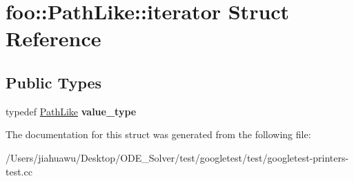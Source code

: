 \hypertarget{structfoo_1_1_path_like_1_1iterator}{}\section{foo\+:\+:Path\+Like\+:\+:iterator Struct Reference}
\label{structfoo_1_1_path_like_1_1iterator}
\subsection*{Public Types}
\begin{DoxyCompactItemize}
\item 
\mbox{\label{structfoo_1_1_path_like_1_1iterator_a797c204878a09e04b23cfe6b48ac7016}} 
typedef \mbox{\hyperlink{classfoo_1_1_path_like}{Path\+Like}} {\bfseries value\+\_\+type}
\end{DoxyCompactItemize}


The documentation for this struct was generated from the following file\+:\begin{DoxyCompactItemize}
\item 
/\+Users/jiahuawu/\+Desktop/\+O\+D\+E\+\_\+\+Solver/test/googletest/test/googletest-\/printers-\/test.\+cc\end{DoxyCompactItemize}
